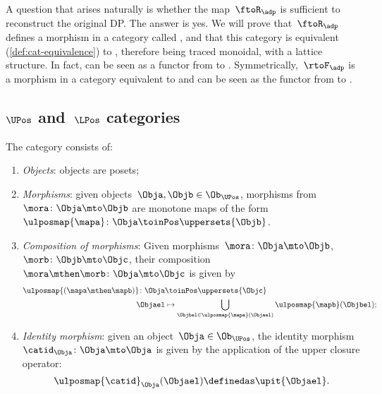 A question that arises naturally is whether the map~$\ftoR_\adp$ is sufficient to reconstruct the original DP.
The answer is yes.
We will prove that~$\ftoR_\adp$ defines a morphism in a category called \UPos, and that this category is equivalent (\cref{def:cat-equivalence}) to \DP, therefore being traced monoidal, with a lattice structure.
In fact, \FixFunMinRes can be seen as a functor from \DP to \UPos.
Symmetrically,~$\rtoF_\adp$ is a morphism in a category \LPos equivalent to \DP and \FixResMaxFun can be seen as the functor from \DP to \LPos.

\subsection{$\UPos$ and~$\LPos$ categories}

\begin{definition}
    \label{def:upos_cat}
    The category \UPos consists of:
    \begin{enumerate}
        \item \emph{Objects}: objects are posets;
        \item \emph{Morphisms}: given objects~$\Obja,\Objb\in \Ob_{\UPos}$, morphisms from~$\mora\colon \Obja \mto \Objb$ are monotone maps of the form~$\ulposmap{\mapa} \colon \Obja \toinPos \uppersets{\Objb}$.
        \item \emph{Composition of morphisms}: Given morphisms~$\mora\colon \Obja \mto \Objb$,~$\morb\colon \Objb\mto \Objc$, their composition~$\mora\mthen \morb\colon \Obja\mto \Objc$ is given by
              \begin{equation}
                  \begin{aligned}
                      \ulposmap{(\mapa \mthen \mapb)} \colon \Obja & \toinPos \uppersets{\Objc}                                                       \\
                      \Objael                                      & \mapsto \bigcup_{\Objbel\in \ulposmap{\mapa}(\Objael)}\ulposmap{\mapb}(\Objbel);
                  \end{aligned}
              \end{equation}
        \item \emph{Identity morphism}: given an object~$\Obja\in \Ob_{\UPos}$, the identity morphism $\catid_\Obja \colon \Obja \mto \Obja$ is given by the application of the upper closure operator:
              \begin{equation}
                  \ulposmap{\catid}_\Obja(\Objael)\definedas \upit\{\Objael\}.
              \end{equation}
    \end{enumerate}
\end{definition}

